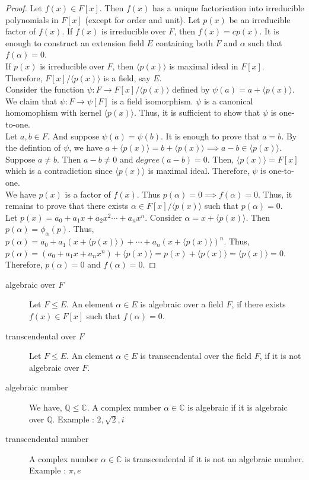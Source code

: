 \begin{proof}
	Let $f(x) \in F[x]$. Then $f(x)$ has a unique factorisation into irreducible polynomials in $F[x]$ (except for order and unit). Let $p(x)$ be an irreducible factor of $f(x)$. If $f(x)$ is irreducible over $F$, then $f(x) = cp(x)$. It is enough to construct an extension field $E$ containing both $F$ and $\alpha$ such that $f(\alpha) = 0$.\\

	If $p(x)$ is irreducible over $F$, then $\langle p(x) \rangle$ is maximal ideal in $F[x]$. Therefore, $F[x]/\langle p(x) \rangle$ is a field, say $E$.\\

	Consider the function $\psi : F \to F[x]/\langle p(x) \rangle$ defined by $\psi(a) = a+\langle p(x) \rangle$. We claim that $\psi : F \to \psi[F]$ is a field isomorphism. $\psi$ is a canonical homomophism with kernel $\langle p(x) \rangle$. Thus, it is sufficient to show that $\psi$ is one-to-one.\\

	Let $a,b \in F$. And suppose $\psi(a) = \psi(b)$. It is enough to prove that $a = b$. By the defintion of $\psi$, we have $a+\langle p(x) \rangle = b + \langle p(x) \rangle \implies a-b \in \langle p(x) \rangle$. Suppose $a \ne b$. Then $a-b \ne 0$ and $degree(a-b) = 0$. Then, $\langle p(x) \rangle = F[x]$ which is a contradiction since $\langle p(x) \rangle$ is maximal ideal. Therefore, $\psi$ is one-to-one.\\
	
	We have $p(x)$ is a factor of $f(x)$. Thus $p(\alpha) = 0 \implies f(\alpha) = 0$. Thus, it remains to prove that there exists $\alpha \in F[x]/\langle p(x) \rangle$ such that $p(\alpha) = 0$.\\

	Let $p(x) = a_0 + a_1x + a_2 x^2\cdots + a_n x^n$. Consider $\alpha = x + \langle p(x) \rangle$. Then $p(\alpha) = \phi_\alpha(p)$. Thus, $p(\alpha) = a_0 + a_1(x+\langle p(x) \rangle) + \cdots + a_n(x + \langle p(x) \rangle)^n$. Thus, $p(\alpha) = (a_0+a_1x + a_n x^n) + \langle p(x) \rangle = p(x) + \langle p(x) \rangle = \langle p(x) \rangle = 0$. Therefore, $p(\alpha) = 0$ and $f(\alpha) = 0$.
\end{proof}

\begin{description}
	\item[algebraic over $F$] Let $F \le E$. An element $\alpha \in E$ is algebraic over a field $F$, if there exists $f(x) \in F[x]$ such that $f(\alpha) = 0$.
	\item[transcendental over $F$] Let $F \le E$. An element $\alpha \in E$ is transcendental over the field $F$, if it is not algebraic over $F$.
	\item[algebraic number] We have, $\mathbb{Q} \le \mathbb{C}$. A complex number $\alpha \in \mathbb{C}$ is algebraic if  it is algebraic over $\mathbb{Q}$. Example : $2,\sqrt{2},i$
	\item[transcendental number] A complex number $\alpha \in \mathbb{C}$ is transcendental if it is not an algebraic number. Example : $\pi,e$
\end{description}

